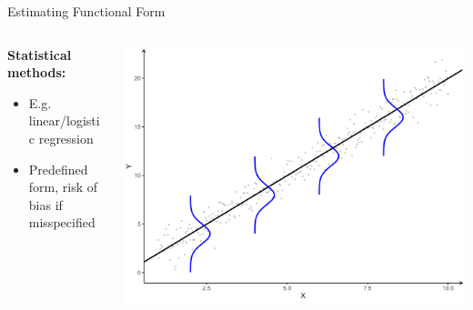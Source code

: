 \documentclass[onlytextwidth,english]{beamer}\usepackage[]{graphicx}\usepackage[]{xcolor}
\begin{document}
\begin{frame}{Estimating Functional Form}

\begin{columns}
\begin{column}{0.75\textwidth}
\textbf{Statistical methods:}
\begin{itemize}
    \item E.g. linear/logistic regression
    \item Predefined form, risk of bias if misspecified
\end{itemize}
\end{column}
\begin{column}{0.23\textwidth}
\includegraphics[width=\textwidth]{img/conditional_distributions.png}
\end{column}
\end{columns}

\vspace{0.3cm}


\end{frame}
\end{document}
